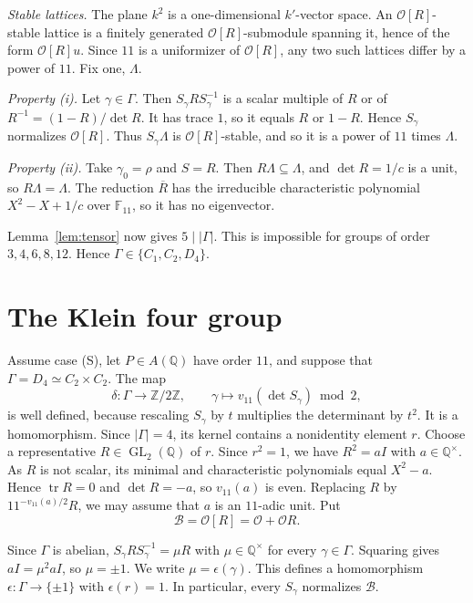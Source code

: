 \documentclass[11pt]{article}
\theoremstyle{remark}
\newcommand{\Q}{\mathbb Q}
\newcommand{\Z}{\mathbb Z}
\newcommand{\F}{\mathbb F}
\DeclareMathOperator{\GL}{GL}
\begin{document}
\emph{Stable lattices.} The plane \(k^2\) is a one-dimensional
\(k'\)-vector space. An \(\mathcal O[R]\)-stable lattice is a finitely
generated \(\mathcal O[R]\)-submodule spanning it, hence of the form
\(\mathcal O[R]u\). Since \(11\) is a uniformizer of \(\mathcal O[R]\),
any two such lattices differ by a power of \(11\). Fix one, \(\Lambda\).

\emph{Property (i).} Let \(\gamma\in\Gamma\). Then
\(S_\gamma RS_\gamma^{-1}\) is a scalar multiple of \(R\) or of
\(R^{-1}=(1-R)/\det R\). It has trace \(1\), so it equals \(R\) or
\(1-R\). Hence \(S_\gamma\) normalizes \(\mathcal O[R]\). Thus
\(S_\gamma\Lambda\) is \(\mathcal O[R]\)-stable, and so it is a power of
\(11\) times \(\Lambda\).

\emph{Property (ii).} Take \(\gamma_0=\rho\) and \(S=R\). Then
\(R\Lambda\subseteq\Lambda\), and \(\det R=1/c\) is a unit, so
\(R\Lambda=\Lambda\). The reduction \(\overline R\) has the irreducible
characteristic polynomial \(X^2-X+1/c\) over \(\F_{11}\), so it has no
eigenvector.

Lemma~\ref{lem:tensor} now gives \(5\mid|\Gamma|\). This is impossible
for groups of order \(3,4,6,8,12\). Hence
\(\Gamma\in\{C_1,C_2,D_4\}\).

\section{The Klein four group}\label{sec:klein}

Assume case (S), let \(P\in A(\Q)\) have order \(11\), and suppose
that \(\Gamma=D_4\simeq C_2\times C_2\). The map
\[
 \delta:\Gamma\to\Z/2\Z,\qquad
 \gamma\mapsto v_{11}(\det S_\gamma)\bmod2,
\]
is well defined, because rescaling \(S_\gamma\) by \(t\) multiplies the
determinant by \(t^2\). It is a homomorphism. Since \(|\Gamma|=4\), its
kernel contains a nonidentity element \(r\). Choose a representative
\(R\in\GL_2(\Q)\) of \(r\). Since \(r^2=1\), we have \(R^2=aI\) with
\(a\in\Q^\times\). As \(R\) is not scalar, its minimal and
characteristic polynomials equal \(X^2-a\). Hence
\(\operatorname{tr}R=0\) and \(\det R=-a\), so \(v_{11}(a)\) is even.
Replacing \(R\) by \(11^{-v_{11}(a)/2}R\), we may assume that \(a\) is
an \(11\)-adic unit. Put
\[
 \mathcal B=\mathcal O[R]=\mathcal O+\mathcal OR.
\]

Since \(\Gamma\) is abelian, \(S_\gamma RS_\gamma^{-1}=\mu R\) with
\(\mu\in\Q^\times\) for every \(\gamma\in\Gamma\). Squaring gives
\(aI=\mu^2aI\), so \(\mu=\pm1\). We write \(\mu=\epsilon(\gamma)\).
This defines a homomorphism \(\epsilon:\Gamma\to\{\pm1\}\) with
\(\epsilon(r)=1\). In particular, every \(S_\gamma\) normalizes
\(\mathcal B\).
\end{document}
